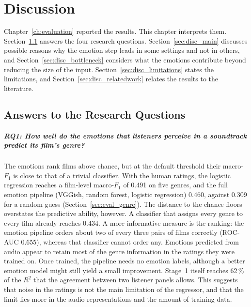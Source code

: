 \chapter{Discussion}
\label{ch:discussion}

Chapter~\ref{ch:evaluation} reported the results. This chapter interprets them.
Section~\ref{sec:disc_rq} answers the four research questions.
Section~\ref{sec:disc_main} discusses possible reasons why the emotion step leads in some settings
and not in others, and Section~\ref{sec:disc_bottleneck} considers what the emotions contribute beyond
reducing the size of the input. Section~\ref{sec:disc_limitations} states the limitations, and
Section~\ref{sec:disc_relatedwork} relates the results to the literature.

\section{Answers to the Research Questions}
\label{sec:disc_rq}

\paragraph{RQ1: How well do the emotions that listeners perceive in a soundtrack predict its film's genre?}
The emotions rank films above chance, but at the default threshold their macro-$F_1$ is close to that of a trivial classifier. With the human ratings, the logistic regression
reaches a film-level macro-$F_1$ of 0.491 on five genres, and the full emotion pipeline
(VGGish, random forest, logistic regression) 0.460, against 0.309 for a random guess
(Section~\ref{sec:eval_genre}). The distance to the chance floors overstates the predictive ability,
however. A classifier that assigns every genre to every film already reaches 0.434. A more
informative measure is the ranking: the emotion pipeline orders about two of every three pairs
of films correctly (ROC-AUC 0.655), whereas that classifier cannot order any. Emotions
predicted from audio appear to retain most of the genre information in the ratings they were
trained on. Once trained, the pipeline needs no emotion labels, although a better
emotion model might still yield a small improvement. Stage~1 itself reaches 62\,\% of the $R^2$ that the
agreement between two listener panels allows. This suggests that noise in the ratings is not
the main limitation of the regressor, and that the limit lies more in the audio
representations and the amount of training data.

